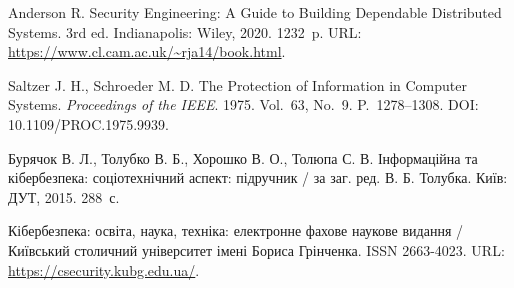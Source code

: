  Anderson R. Security Engineering: A Guide to Building Dependable Distributed Systems. 3rd ed. Indianapolis: Wiley, 2020. 1232~p. URL: \url{https://www.cl.cam.ac.uk/~rja14/book.html}.

 Saltzer J. H., Schroeder M. D. The Protection of Information in Computer Systems. \emph{Proceedings of the IEEE}. 1975. Vol.~63, No.~9. P.~1278--1308. DOI: 10.1109/PROC.1975.9939.

 Бурячок В. Л., Толубко В. Б., Хорошко В. О., Толюпа С. В. Інформаційна та кібербезпека: соціотехнічний аспект: підручник / за заг. ред. В. Б. Толубка. Київ: ДУТ, 2015. 288~с.

 Кібербезпека: освіта, наука, техніка: електронне фахове наукове видання / Київський столичний університет імені Бориса Грінченка. ISSN 2663-4023. URL: \url{https://csecurity.kubg.edu.ua/}.
